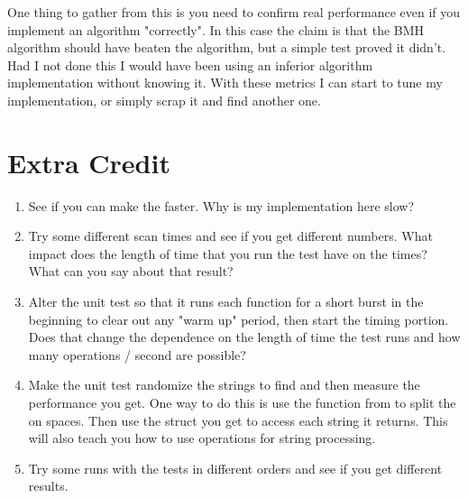One thing to gather from this is you need to confirm real performance even if
you implement an algorithm "correctly".  In this case the claim is that the BMH
algorithm should have beaten the  algorithm, but a simple test
proved it didn't.  Had I not done this I would have been using an inferior
algorithm implementation without knowing it.  With these metrics I can start to
tune my implementation, or simply scrap it and find another one.

\section{Extra Credit}

\begin{enumerate}
\item See if you can make the  faster.  Why is my implementation
    here slow?
\item Try some different scan times and see if you get different numbers.
    What impact does the length of time that you run the test have on
    the  times?  What can you say about that result?
\item Alter the unit test so that it runs each function for a short burst
    in the beginning to clear out any "warm up" period, then start the
    timing portion.  Does that change the dependence on the length of time
    the test runs and how many operations / second are possible?
\item Make the unit test randomize the strings to find and then measure
    the performance you get.  One way to do this is use the 
    function from  to split the  on 
    spaces.  Then use the  struct you get to access each
    string it returns.  This will also teach you how to use 
    operations for string processing.
\item Try some runs with the tests in different orders and see if you get different
    results.
\end{enumerate}

